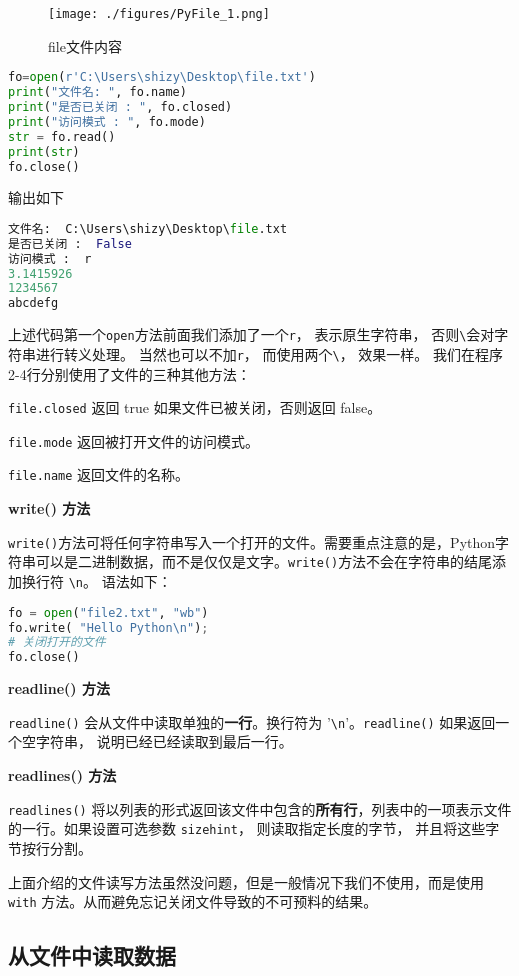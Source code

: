 \begin{figure}[ht]\label{PyFile_fig2}
\centering
\texttt{[image: ./figures/PyFile\_1.png]}
\caption{file文件内容} \label{PyFile_fig1}
\end{figure}
\begin{lstlisting}[language=python]
fo=open(r'C:\Users\shizy\Desktop\file.txt')
print("文件名: ", fo.name)
print("是否已关闭 : ", fo.closed)
print("访问模式 : ", fo.mode)
str = fo.read()
print(str)
fo.close()
\end{lstlisting}
输出如下
\begin{lstlisting}[language=python]
文件名:  C:\Users\shizy\Desktop\file.txt
是否已关闭 :  False
访问模式 :  r
3.1415926
1234567
abcdefg
\end{lstlisting}
上述代码第一个\verb|open|方法前面我们添加了一个\verb|r|， 表示原生字符串， 否则\verb|\|会对字符串进行转义处理。 当然也可以不加\verb|r|， 而使用两个\verb|\|， 效果一样。 我们在程序2-4行分别使用了文件的三种其他方法：

\verb|file.closed| 返回 true 如果文件已被关闭，否则返回 false。

\verb|file.mode| 返回被打开文件的访问模式。

\verb|file.name| 返回文件的名称。


\textbf{write() 方法}

\verb|write()|方法可将任何字符串写入一个打开的文件。需要重点注意的是，Python字符串可以是二进制数据，而不是仅仅是文字。\verb|write()|方法不会在字符串的结尾添加换行符 \verb|\n|。 语法如下：
\begin{lstlisting}[language=python]
fo = open("file2.txt", "wb")
fo.write( "Hello Python\n");
# 关闭打开的文件
fo.close()
\end{lstlisting}

\textbf{readline() 方法}

\verb|readline()| 会从文件中读取单独的\textbf{一行}。换行符为 '\verb|\n|'。\verb|readline()| 如果返回一个空字符串， 说明已经已经读取到最后一行。

\textbf{readlines() 方法}

\verb|readlines()| 将以列表的形式返回该文件中包含的\textbf{所有行}，列表中的一项表示文件的一行。如果设置可选参数 \verb|sizehint|， 则读取指定长度的字节， 并且将这些字节按行分割。

上面介绍的文件读写方法虽然没问题，但是一般情况下我们不使用，而是使用\verb|with| 方法。从而避免忘记关闭文件导致的不可预料的结果。


\subsection{从文件中读取数据}
